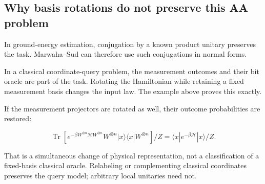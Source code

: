 \subsection{Why basis rotations do not preserve this AA
problem}\label{quant:sec-4}

In ground-energy estimation, conjugation by a known product unitary
preserves the task. Marwaha--Sud can therefore use such conjugations in
normal forms.

In a classical coordinate-query problem, the measurement outcomes and
their bit oracle are part of the task. Rotating the Hamiltonian while
retaining a fixed measurement basis changes the input law. The example
above proves this exactly.

If the measurement projectors are rotated as well, their outcome
probabilities are restored:

\[
\operatorname{Tr}\!\left[
e^{-\beta W^{\otimes n}\mathcal H W^{\otimes n}}
W^{\otimes n}|x\rangle\langle x|W^{\otimes n}
\right]/Z
=\langle x|e^{-\beta\mathcal H}|x\rangle/Z.
\]

That is a simultaneous change of physical representation, not a
classification of a fixed-basis classical oracle. Relabeling or
complementing classical coordinates preserves the query model; arbitrary
local unitaries need not.
